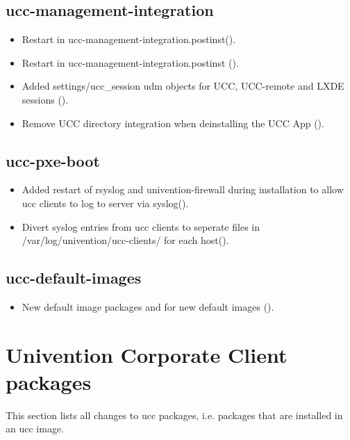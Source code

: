 \subsection{ucc-management-integration}
\begin{itemize}
\item Restart  in ucc-management-integration.postinst().
\item Restart  in ucc-management-integration.postinst ().
\item Added settings/ucc\_session udm objects for UCC, UCC-remote and LXDE sessions ().
\item Remove UCC directory integration when deinstalling the UCC App ().
\end{itemize}

\subsection{ucc-pxe-boot}
\begin{itemize}
\item Added restart of rsyslog and univention-firewall during installation to allow ucc clients to log to server via syslog().
\item Divert syslog entries from ucc clients to seperate files in /var/log/univention/ucc-clients/ for each host().
\end{itemize}

\subsection{ucc-default-images}
\begin{itemize}
\item New default image packages  and  for new default images ().
\end{itemize}

\section{Univention Corporate Client packages}
This section lists all changes to ucc packages, i.e. packages that are installed in an ucc image.
